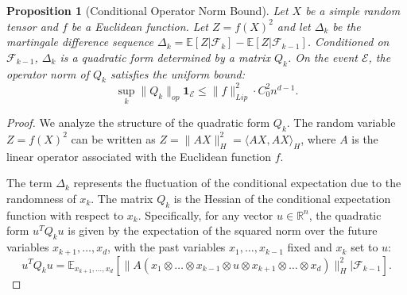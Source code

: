 \documentclass[11pt]{amsart}
\newtheorem{proposition}[theorem]{Proposition}
\theoremstyle{definition}
\theoremstyle{remark}
\begin{document}
\begin{proposition}[Conditional Operator Norm Bound]\label{prop:5.4}
Let $X$ be a simple random tensor and $f$ be a Euclidean function. Let $Z = f(X)^2$ and let $\Delta_k$ be the martingale difference sequence $\Delta_k = \mathbb{E}[Z | \mathcal{F}_k] - \mathbb{E}[Z | \mathcal{F}_{k-1}]$. Conditioned on $\mathcal{F}_{k-1}$, $\Delta_k$ is a quadratic form determined by a matrix $Q_k$. On the event $\mathcal{E}$, the operator norm of $Q_k$ satisfies the uniform bound:
\begin{equation}
\sup_k \|Q_k\|_{op} \mathbf{1}_{\mathcal{E}} \le \|f\|_{Lip}^2 \cdot C_0^2 n^{d-1}.
\end{equation}
\end{proposition}

\begin{proof}
We analyze the structure of the quadratic form $Q_k$. The random variable $Z = f(X)^2$ can be written as $Z = \|AX\|_H^2 = \langle AX, AX \rangle_H$, where $A$ is the linear operator associated with the Euclidean function $f$.

The term $\Delta_k$ represents the fluctuation of the conditional expectation due to the randomness of $x_k$. The matrix $Q_k$ is the Hessian of the conditional expectation function with respect to $x_k$. Specifically, for any vector $u \in \mathbb{R}^n$, the quadratic form $u^T Q_k u$ is given by the expectation of the squared norm over the future variables $x_{k+1}, \dots, x_d$, with the past variables $x_1, \dots, x_{k-1}$ fixed and $x_k$ set to $u$:
\begin{equation}
u^T Q_k u = \mathbb{E}_{x_{k+1}, \dots, x_d} \left[ \| A(x_1 \otimes \dots \otimes x_{k-1} \otimes u \otimes x_{k+1} \otimes \dots \otimes x_d) \|_H^2 \bigg| \mathcal{F}_{k-1} \right].
\end{equation}


\end{proof}
\end{document}
